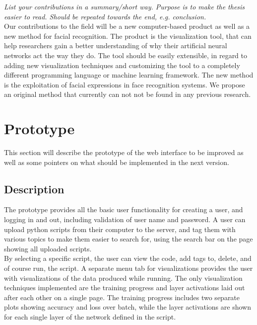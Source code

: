 \textit{List your contributions in a summary/short way. Purpose is to make the thesis easier to read. Should be repeated towards the end, e.g. conclusion.} \\

\noindent Our contributions to the field will be a new computer-based product as well as a new method for facial recognition. The product is the visualization tool, that can help researchers gain a better understanding of why their artificial neural networks act the way they do. The tool should be easily extensible, in regard to adding new visualization techniques and customizing the tool to a completely different programming language or machine learning framework. The new method is the exploitation of facial expressions in face recognition systems. We propose an original method that currently can not not be found in any previous research.

\section{Prototype}

This section will describe the prototype of the web interface to be improved as well as some pointers on what should be implemented in the next version.

\subsection{Description}

\noindent The prototype provides all the basic user functionality for creating a user, and logging in and out, including validation of user name and password. A user can upload python scripts from their computer to the server, and tag them with various topics to make them easier to search for, using the search bar on the page showing all uploaded scripts. \\

\noindent By selecting a specific script, the user can view the code, add tags to, delete, and of course run, the script. A separate menu tab for visualizations provides the user with visualizations of the data produced while running. The only visualization techniques implemented are the training progress and layer activations laid out after each other on a single page. The training progress includes two separate plots showing accuracy and loss over batch, while the layer activations are shown for each single layer of the network defined in the script.

